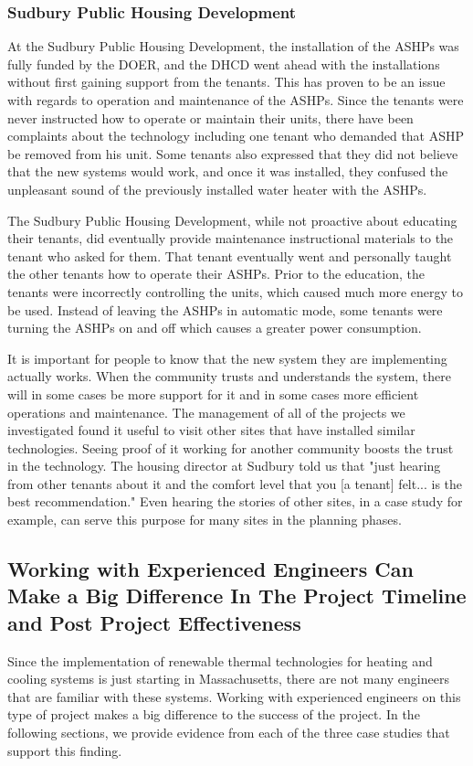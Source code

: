 \subsubsection{Sudbury Public Housing Development}
\par At the Sudbury Public Housing Development, the installation of the ASHPs was fully funded by the DOER, and the DHCD went ahead with the installations without first gaining support from the tenants. This has proven to be an issue with regards to operation and maintenance of the ASHPs. Since the tenants were never instructed how to operate or maintain their units, there have been complaints about the technology including one tenant who demanded that ASHP be removed from his unit. Some tenants also expressed that they did not believe that the new systems would work, and once it was installed, they confused the unpleasant sound of the previously installed water heater with the ASHPs.
\par The Sudbury Public Housing Development, while not proactive about educating their tenants, did eventually provide maintenance instructional materials to the tenant who asked for them. That tenant eventually went and personally taught the other tenants how to operate their ASHPs. Prior to the education, the tenants were incorrectly controlling the units, which caused much more energy to be used. Instead of leaving the ASHPs in automatic mode, some tenants were turning the ASHPs on and off which causes a greater power consumption.
\par It is important for people to know that the new system they are implementing actually works. When the community trusts and understands the system, there will in some cases be more support for it and in some cases more efficient operations and maintenance. The management of all of the projects we investigated found it useful to visit other sites that have installed similar technologies. Seeing proof of it working for another community boosts the trust in the technology. The housing director at Sudbury told us that "just hearing from other tenants about it and the comfort level that you [a tenant] felt... is the best recommendation." Even hearing the stories of other sites, in a case study for example, can serve this purpose for many sites in the planning phases.

\subsection{Working with Experienced Engineers Can Make a Big Difference In The Project Timeline and Post Project Effectiveness}
\par Since the implementation of renewable thermal technologies for heating and cooling systems is just starting in Massachusetts, there are not many engineers that are familiar with these systems. Working with experienced engineers on this type of project makes a big difference to the success of the project. In the following sections, we provide evidence from each of the three case studies that support this finding.

